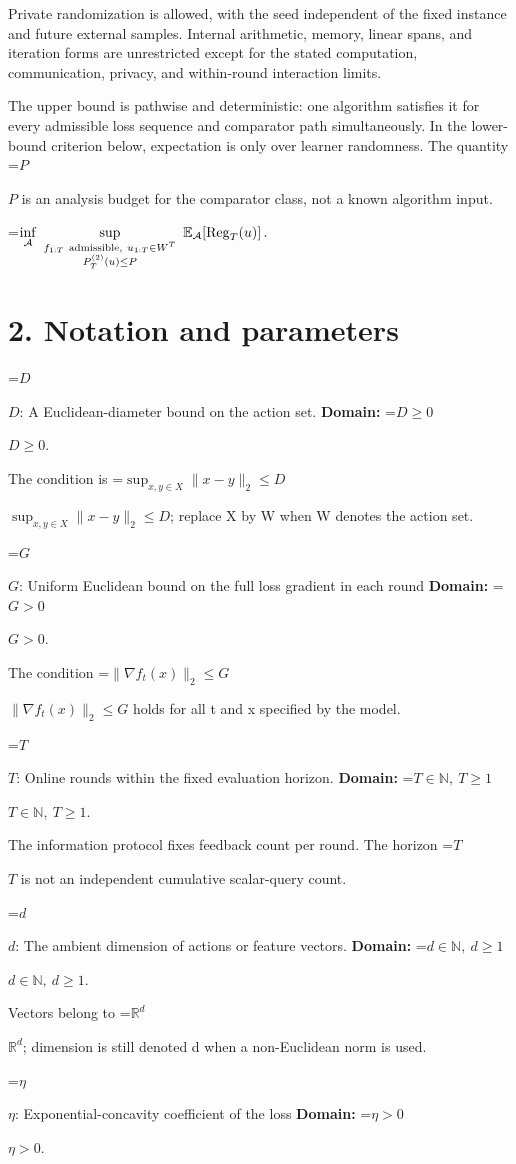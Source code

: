 \documentclass[10pt,a4paper]{article}
\newcommand{\AtlasMath}[1]{\par\begingroup\centering\setbox0=\hbox{$\displaystyle #1$}\ifdim\wd0>1.4\linewidth\typeout{ATLAS WIDE FORMULA: \the\wd0}\fi\ifdim\wd0>\linewidth\resizebox{\linewidth}{!}{\box0}\else\box0\fi\par\endgroup}
\newcommand{\AtlasInlineMath}[1]{\begingroup\setbox0=\hbox{$#1$}\ifdim\wd0>.4\linewidth\endgroup\AtlasMath{#1}\else\endgroup$#1$\fi}
\begin{document}
Private randomization is allowed, with the seed independent of the fixed instance and future external samples. Internal arithmetic, memory, linear spans, and iteration forms are unrestricted except for the stated computation, communication, privacy, and within-round interaction limits.

The upper bound is pathwise and deterministic: one algorithm satisfies it for every admissible loss sequence and comparator path simultaneously. In the lower-bound criterion below, expectation is only over learner randomness. The quantity \AtlasInlineMath{P} is an analysis budget for the comparator class, not a known algorithm input.


\AtlasMath{\inf_{\mathcal{A}}\ \sup_{\substack{f_{1:T}\ \text{\text{admissible}},\ u_{1:T}\in W^T\\ P_T^{(2)}(u)\le P}}\ \mathbb{E}_{\mathcal{A}}\!\left[\operatorname{Reg}_T(u)\right].}


\section{2. Notation and parameters}
\AtlasInlineMath{D}: A Euclidean-diameter bound on the action set. \textbf{Domain:} \AtlasInlineMath{D\ge0}.

The condition is \AtlasInlineMath{\sup_{x,y\in X}\|x-y\|_2\le D}; replace X by W when W denotes the action set.

\AtlasInlineMath{G}: Uniform Euclidean bound on the full loss gradient in each round \textbf{Domain:} \AtlasInlineMath{G>0}.

The condition \AtlasInlineMath{\|\nabla f_t(x)\|_2\le G} holds for all t and x specified by the model.

\AtlasInlineMath{T}: Online rounds within the fixed evaluation horizon. \textbf{Domain:} \AtlasInlineMath{T\in\mathbb N,\ T\ge1}.

The information protocol fixes feedback count per round. The horizon \AtlasInlineMath{T} is not an independent cumulative scalar-query count.

\AtlasInlineMath{d}: The ambient dimension of actions or feature vectors. \textbf{Domain:} \AtlasInlineMath{d\in\mathbb N,\ d\ge1}.

Vectors belong to \AtlasInlineMath{\mathbb R^d}; dimension is still denoted d when a non-Euclidean norm is used.

\AtlasInlineMath{\eta}: Exponential-concavity coefficient of the loss \textbf{Domain:} \AtlasInlineMath{\eta>0}.
\end{document}
